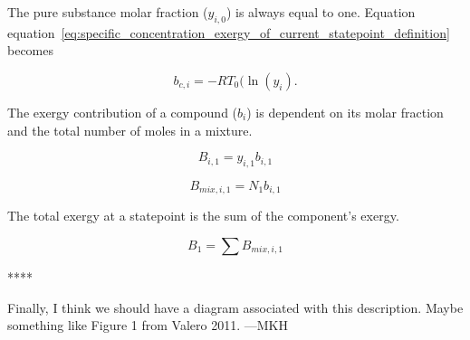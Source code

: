\documentclass[energies,article,submit,pdftex,moreauthors]{Definitions/mdpi}
\begin{document}
The pure substance molar fraction ($y_{i,0}$) is always equal to one.
Equation equation~\ref{eq:specific_concentration_exergy_of_current_statepoint_definition} becomes

\begin{equation}\label{eq:specific_concentration_exergy_of_current_statepoint_definition}
  b_{c,i} = -RT_{0}(\ln(y_{i}).
\end{equation}

The exergy contribution of a compound ($b_i$) is dependent
on its molar fraction
and the total number of moles
in a mixture.

\begin{equation}\label{eq:specific_exergy_of_current_statepoint_molar_based_definition}
  B_{i,1} = y_{i,1}b_{i,1}
\end{equation}

\begin{equation}\label{eq:specific_exergy_of_current_statepoint_mixture_definition}
  B_{mix,i,1} = N_{1}b_{i,1}
\end{equation}

The total exergy at a statepoint
is the sum of the component's exergy.

\begin{equation}\label{eq:total_exergy_of_current_statepoint_mixture_definition}
  B_{1} = \sum{B_{mix,i,1}}
\end{equation}



%
%
%


****

Finally, I think we should have a diagram associated with this description.
Maybe something like Figure 1 from Valero 2011.
---MKH
\end{document}
